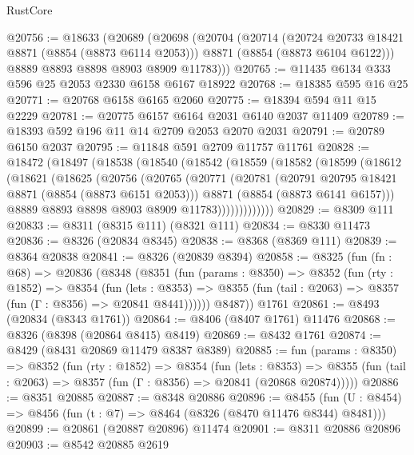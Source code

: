 \begin{lexlean}{RustCore}
\begin{coremodule}
@20756 := @18633
    (@20689
      (@20698
        (@20704
          (@20714
            (@20724 @20733 @18421 @8871 (@8854 (@8873 @6114 @2053)))
            @8871
            (@8854 (@8873 @6104 @6122)))
          @8889
          @8893
          @8898
          @8903
          @8909
          @11783)))
@20765 := @11435 @6134 @333 @596 @25 @2053 @2330 @6158 @6167 @18922
@20768 := @18385 @595 @16 @25
@20771 := @20768 @6158 @6165 @2060
@20775 := @18394 @594 @11 @15 @2229
@20781 := @20775 @6157 @6164 @2031 @6140 @2037 @11409
@20789 := @18393 @592 @196 @11 @14 @2709 @2053 @2070 @2031
@20791 := @20789 @6150 @2037
@20795 := @11848 @591 @2709 @11757 @11761
@20828 := @18472
    (@18497
      (@18538
        (@18540
          (@18542
            (@18559
              (@18582
                (@18599
                  (@18612
                    (@18621
                      (@18625
                        (@20756
                          (@20765
                            (@20771
                              (@20781
                                (@20791 @20795 @18421 @8871 (@8854 (@8873 @6151 @2053)))
                                @8871
                                (@8854 (@8873 @6141 @6157)))
                              @8889
                              @8893
                              @8898
                              @8903
                              @8909
                              @11783)))))))))))))
@20829 := @8309 @111
@20833 := @8311 (@8315 @111) (@8321 @111)
@20834 := @8330 @11473
@20836 := @8326 (@20834 @8345)
@20838 := @8368 (@8369 @111)
@20839 := @8364 @20838
@20841 := @8326 (@20839 @8394)
@20858 := @8325
    (fun (fn : @68) =>
    @20836
      (@8348
        (@8351
          (fun (params : @8350) =>
          @8352
            (fun (rty : @1852) =>
            @8354
              (fun (lets : @8353) =>
              @8355 (fun (tail : @2063) => @8357 (fun (Γ : @8356) => @20841 @8441))))))
        @8487))
    @1761
@20861 := @8493 (@20834 (@8343 @1761))
@20864 := @8406 (@8407 @1761) @11476
@20868 := @8326 (@8398 (@20864 @8415) @8419)
@20869 := @8432 @1761
@20874 := @8429 (@8431 @20869 @11479 @8387 @8389)
@20885 := fun (params : @8350) =>
  @8352
    (fun (rty : @1852) =>
    @8354
      (fun (lets : @8353) =>
      @8355 (fun (tail : @2063) => @8357 (fun (Γ : @8356) => @20841 (@20868 @20874)))))
@20886 := @8351 @20885
@20887 := @8348 @20886
@20896 := @8455
    (fun (U : @8454) => @8456 (fun (t : @7) => @8464 (@8326 (@8470 @11476 @8344) @8481)))
@20899 := @20861 (@20887 @20896) @11474
@20901 := @8311 @20886 @20896
@20903 := @8542 @20885 @2619

\end{coremodule}
\end{lexlean}
